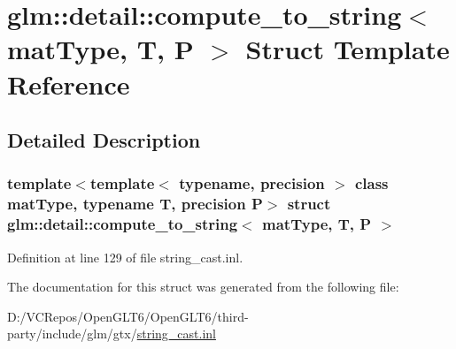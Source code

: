 \hypertarget{structglm_1_1detail_1_1compute__to__string}{}\section{glm\+::detail\+::compute\+\_\+to\+\_\+string$<$ mat\+Type, T, P $>$ Struct Template Reference}
\label{structglm_1_1detail_1_1compute__to__string}


\subsection{Detailed Description}
\subsubsection*{template$<$template$<$ typename, precision $>$ class mat\+Type, typename T, precision P$>$\newline
struct glm\+::detail\+::compute\+\_\+to\+\_\+string$<$ mat\+Type, T, P $>$}



Definition at line 129 of file string\+\_\+cast.\+inl.



The documentation for this struct was generated from the following file\+:\begin{DoxyCompactItemize}
\item 
D\+:/\+V\+C\+Repos/\+Open\+G\+L\+T6/\+Open\+G\+L\+T6/third-\/party/include/glm/gtx/\mbox{\hyperlink{string__cast_8inl}{string\+\_\+cast.\+inl}}\end{DoxyCompactItemize}
